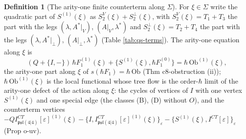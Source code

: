 \documentclass[11pt]{article}
\numberwithin{equation}{section}
\theoremstyle{plain}
\theoremstyle{definition}
\newtheorem{definition}[theorem]{Definition}
\newcommand{\Ap}{A|_{\perp}}
\newcommand{\AV}{A|_V}
\begin{document}
\begin{definition}[The arity-one finite counterterm along $\Sigma$]
\label{def:qs-Fxi}
For $\xi\in\Sigma$ write the quadratic part of $S^{(1)}(\xi)$ as $S^V_2(\xi)+S^\perp_2(\xi)$, with $S^V_2(\xi)=T_1+T_3$ the part with the legs $(\lambda,A^*|_V)$, $(\AV,\lambda^*)$ and $S^\perp_2(\xi)=T_2+T_4$ the part with the legs $(\lambda,A^*|_\perp)$, $(\Ap,\lambda^*)$ (Table \ref{tab:qs-terms}). The arity-one equation along $\xi$ is
\begin{equation}
(Q+\{I,-\})\,\hbar F_1^{(1)}(\xi)+\big\{S^{(1)}(\xi),\hbar F_1^{(0)}\big\}=\hbar\,\mathrm{Ob}^{(1)}(\xi),
\label{eq:qs-arity1xi}
\end{equation}
the arity-one part along $\xi$ of $s(\hbar F_1)=\hbar\,\mathrm{Ob}$ (Thm c8-obstruction (ii)); $\hbar\,\mathrm{Ob}^{(1)}(\xi)$ is the local functional whose tree flow is the order-$\hbar$ limit of the arity-one defect of the action along $\xi$: the cycles of vertices of $I$ with one vertex $S^{(1)}(\xi)$ and one special edge (the classes (B), (D) without $O$), and the counterterm vertices $-QI^{CT}_{\mathfrak{psl}(4|4)}[\varepsilon]^{(1)}(\xi)-\{I,I^{CT}_{\mathfrak{psl}(4|4)}[\varepsilon]^{(1)}(\xi)\}_\varepsilon-\{S^{(1)}(\xi),I^{CT}[\varepsilon]\}_\varepsilon$ (Prop o-uv).
\end{definition}
\end{document}
